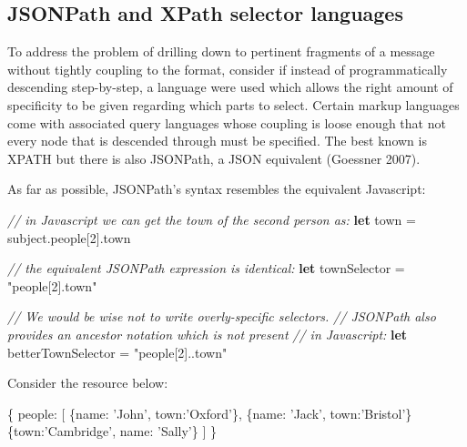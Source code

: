 \documentclass[12pt, ]{article}
\newenvironment{Shaded}{}{}
\newcommand{\KeywordTok}[1]{\textcolor[rgb]{0.00,0.44,0.13}{\textbf{{#1}}}}
\newcommand{\DataTypeTok}[1]{\textcolor[rgb]{0.56,0.13,0.00}{{#1}}}
\newcommand{\DecValTok}[1]{\textcolor[rgb]{0.25,0.63,0.44}{{#1}}}
\newcommand{\StringTok}[1]{\textcolor[rgb]{0.25,0.44,0.63}{{#1}}}
\newcommand{\CommentTok}[1]{\textcolor[rgb]{0.38,0.63,0.69}{\textit{{#1}}}}
\newcommand{\OtherTok}[1]{\textcolor[rgb]{0.00,0.44,0.13}{{#1}}}
\newcommand{\FunctionTok}[1]{\textcolor[rgb]{0.02,0.16,0.49}{{#1}}}
\newcommand{\NormalTok}[1]{{#1}}
\begin{document}
\subsection{JSONPath and XPath selector
languages}\label{jsonpath-and-xpath-selector-languages}

\label{jsonpathxpath}

To address the problem of drilling down to pertinent fragments of a
message without tightly coupling to the format, consider if instead of
programmatically descending step-by-step, a language were used which
allows the right amount of specificity to be given regarding which parts
to select. Certain markup languages come with associated query languages
whose coupling is loose enough that not every node that is descended
through must be specified. The best known is XPATH but there is also
JSONPath, a JSON equivalent (Goessner 2007).

As far as possible, JSONPath's syntax resembles the equivalent
Javascript:

\begin{Shaded}
\begin{Highlighting}[]
\CommentTok{// in Javascript we can get the town of the second person as:}
\KeywordTok{let} \NormalTok{town = }\OtherTok{subject}\NormalTok{.}\FunctionTok{people}\NormalTok{[}\DecValTok{2}\NormalTok{].}\FunctionTok{town}

\CommentTok{// the equivalent JSONPath expression is identical:}
\KeywordTok{let} \NormalTok{townSelector = }\StringTok{"people[2].town"}

\CommentTok{// We would be wise not to write overly-specific selectors.}
\CommentTok{// JSONPath also provides an ancestor notation which is not present}
\CommentTok{// in Javascript:}
\KeywordTok{let} \NormalTok{betterTownSelector = }\StringTok{"people[2]..town"}
\end{Highlighting}
\end{Shaded}

Consider the resource below:

\begin{Shaded}
\begin{Highlighting}[]
\NormalTok{\{}
   \DataTypeTok{people}\NormalTok{: [}
      \NormalTok{\{}\DataTypeTok{name}\NormalTok{: }\StringTok{'John'}\NormalTok{, }\DataTypeTok{town}\NormalTok{:}\StringTok{'Oxford'}\NormalTok{\},}
      \NormalTok{\{}\DataTypeTok{name}\NormalTok{: }\StringTok{'Jack'}\NormalTok{, }\DataTypeTok{town}\NormalTok{:}\StringTok{'Bristol'}\NormalTok{\}}
      \NormalTok{\{}\DataTypeTok{town}\NormalTok{:}\StringTok{'Cambridge'}\NormalTok{, }\DataTypeTok{name}\NormalTok{: }\StringTok{'Sally'}\NormalTok{\}}
   \NormalTok{]}
\NormalTok{\}}
\end{Highlighting}
\end{Shaded}
\end{document}
